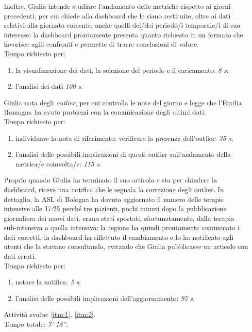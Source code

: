 Inoltre, Giulia intende studiare l'andamento delle metriche rispetto ai giorni precedenti, per cui chiede alla dashboard che le siano restituite, oltre ai dati relativi alla giornata corrente, anche quelli del/dei periodo/i temporale/i di suo interesse: la dashboard prontamente presenta quanto richiesto in un formato che favorisce agili confronti e permette di trarre conclusioni di valore.\\
Tempo richiesto per:
\begin{enumerate}
    \item la visualizzazione dei dati, la selezione del periodo e il caricamento: \textit{8 s};
    \item l'analisi dei dati \textit{100 s}.
\end{enumerate}

Giulia nota degli \textit{outlier}, per cui controlla le note del giorno e legge che l'Emilia Romagna ha avuto problemi con la comunicazione degli ultimi dati.\\
Tempo richiesto per:
\begin{enumerate}
    \item individuare la nota di riferimento, verificare la presenza dell'outlier: \textit{35 s};
    \item l'analisi delle possibili implicazioni di questi outlier sull'andamento della metrica/e coinvolta/e: \textit{115 s}.
\end{enumerate}

Proprio quando Giulia ha terminato il suo articolo e sta per chiudere la dashboard, riceve una notifica che le segnala la correzione degli outlier. In dettaglio, la ASL di Bologna ha dovuto aggiornato il numero delle terapie intensive alle 17:25 perché tre pazienti, pochi minuti dopo la pubblicazione giornaliera dei nuovi dati, erano stati spostati, sfortunatamente, dalla terapia sub-intensiva a quella intensiva: la regione ha quindi prontamente comunicato i dati corretti, la dashboard ha riflettuto il cambiamento e lo ha notificato agli utenti che la stavano consultando, evitando che Giulia pubblicasse un articolo con dati errati.\\
Tempo richiesto per:
\begin{enumerate}
    \item notare la notifica: \textit{5 s};
    \item l'analisi delle possibili implicazioni dell'aggiornamento: \textit{95 s}.
\end{enumerate}
\noindent
Attività svolte: \ref{itm:1}, \ref{itm:2}.\\  
Tempo totale: \textit{7' 18''}. 

